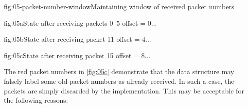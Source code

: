 \begin{myFigure}{fig:05-packet-number-window}{Maintaining window of received packet numbers}

  \begin{mySubfigure}{\textwidth}{fig:05a}{State after receiving packets 0--5}
    offset = 0\hspace{1cm}...
  \end{mySubfigure}

  \medskip

  \begin{mySubfigure}{\textwidth}{fig:05b}{State after receiving packet 11}
    offset = 4\hspace{1cm}...
  \end{mySubfigure}

  \medskip

  \begin{mySubfigure}{\textwidth}{fig:05c}{State after receiving packet 15}
    offset = 8\hspace{1cm}...
  \end{mySubfigure}

\end{myFigure}

\setlength{\fboxsep}{\origframesep}

The red packet numbers in \autoref{fig:05c} demonstrate that the data structure may falsely label
some old packet numbers as already received. In such a case, the packets are simply discarded by the
\ManagedQuicConnection{} implementation. This may be acceptable for the following reasons:

